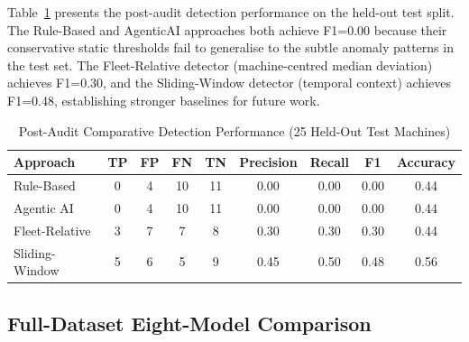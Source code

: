 Table~\ref{tab:pat} presents the post-audit detection performance on the held-out test split. The Rule-Based and AgenticAI approaches both achieve F1=0.00 because their conservative static thresholds fail to generalise to the subtle anomaly patterns in the test set. The Fleet-Relative detector (machine-centred median deviation) achieves F1=0.30, and the Sliding-Window detector (temporal context) achieves F1=0.48, establishing stronger baselines for future work.
\begin{table}[!htbp]
\centering
\caption{Post-Audit Comparative Detection Performance (25 Held-Out Test Machines)}
\label{tab:pat}
\begin{tabular}{lcccccccc}
\hline
\textbf{Approach} & \textbf{TP} & \textbf{FP} & \textbf{FN} & \textbf{TN} & \textbf{Precision} & \textbf{Recall} & \textbf{F1} & \textbf{Accuracy} \\
\hline
Rule-Based   & 0 & 4  & 10 & 11 & 0.00 & 0.00 & 0.00 & 0.44 \\
Agentic AI   & 0 & 4  & 10 & 11 & 0.00 & 0.00 & 0.00 & 0.44 \\
Fleet-Relative & 3 & 7  & 7  & 8  & 0.30 & 0.30 & 0.30 & 0.44 \\
Sliding-Window & 5 & 6  & 5  & 9  & 0.45 & 0.50 & 0.48 & 0.56 \\
\hline
\end{tabular}
\end{table}
\subsection{Full-Dataset Eight-Model Comparison}

